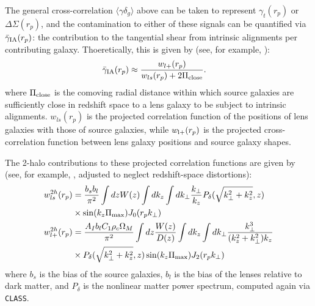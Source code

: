\documentclass[a4paper,fleqn,usenatbib]{mnras}
\begin{document}
The general cross-correlation $\langle \gamma \delta_g \rangle$ above can be taken to represent $\gamma_t(r_p)$ or $\Delta \Sigma(r_p)$, and the contamination to either of these signals can be quantified via $\bar{\gamma}_{\rm IA}(r_p)$: the contribution to the tangential shear from intrinsic alignments per contributing galaxy. Thoeretically, this is given by (see, for example, \cite{Blazek2012}):
\begin{align}
\bar{\gamma}_{\rm IA}(r_p) &\approx \frac{w_{l+}(r_p)}{w_{ls}(r_p)+ 2 \Pi_{\rm close}}.
\label{gammaIA_the}
\end{align} 
where $\Pi_{\rm close}$ is the comoving radial distance within which source galaxies are sufficiently close in redshift space to a lens galaxy to be subject to intrinsic alignments. $w_{ls}(r_p)$ is the projected correlation function of the positions of lens galaxies with those of source galaxies, while $w_{\rm l+}(r_p)$ is the projected cross-correlation function between lens galaxy positions and source galaxy shapes. 

The 2-halo contributions to these projected correlation functions are given by (see, for example, \cite{Singh2014}, adjusted to neglect redshift-space distortions):
\begin{align}
w_{ls}^{2h}(r_p) &= \frac{b_s b_l}{\pi^2} \int dz W(z) \int dk_z  \int dk_\perp  \frac{k_\perp}{k_z} P_{\delta}(\sqrt{k_\perp^2 + k_z^2}, z) \nonumber \\ &\times \sin(k_z \Pi_{\rm max}) J_0(r_p k_\perp) \label{wls_2h}  \\
w_{l+}^{2h}(r_p) &= \frac{A_I b_l C_1 \rho_c \Omega_M}{\pi^2} \int dz \frac{W(z)}{D(z)}\int dk_z  \int dk_\perp  \frac{k_\perp^3 }{(k_z^2 + k_\perp^2)k_z} \nonumber \\ &\times P_{\delta}(\sqrt{k_\perp^2 + k_z^2}, z) \sin(k_z \Pi_{\rm max}) J_2(r_p k_\perp)
\label{wlp_2h}
\end{align}
where $b_s$ is the bias of the source galaxies, $b_l$ is the bias of the lenses relative to dark matter, and $P_\delta$ is the nonlinear matter power spectrum, computed again via {\tt CLASS}. 
\end{document}
